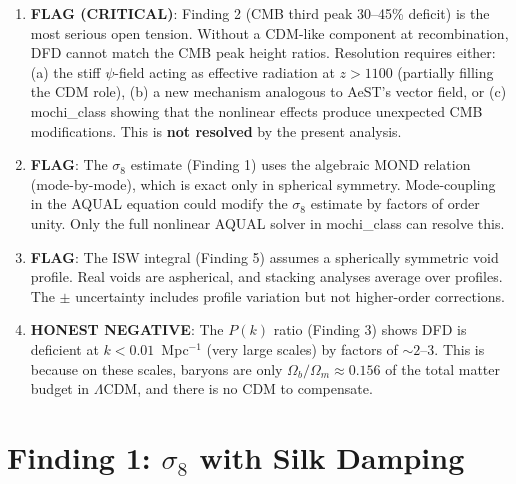 \documentclass[11pt]{article}
\newcommand{\LCDM}{$\Lambda$CDM}
\newcommand{\Ob}{\Omega_b}
\newcommand{\Om}{\Omega_m}
\begin{document}
\begin{tcolorbox}[colback=red!5!white, colframe=red!60!black,
  title=\textbf{INCONSISTENCIES, FLAGS, AND HONEST NEGATIVES}]
\begin{enumerate}[nosep]
\item \textbf{FLAG (CRITICAL)}: Finding 2 (CMB third peak 30--45\% deficit)
  is the most serious open tension. Without a CDM-like component at
  recombination, DFD cannot match the CMB peak height ratios.
  Resolution requires either: (a) the stiff $\psi$-field acting as
  effective radiation at $z > 1100$ (partially filling the CDM role),
  (b) a new mechanism analogous to AeST's vector field, or
  (c) mochi\_class showing that the nonlinear effects produce unexpected
  CMB modifications. This is \textbf{not resolved} by the present analysis.

\item \textbf{FLAG}: The $\sigma_8$ estimate (Finding 1) uses the
  algebraic MOND relation (mode-by-mode), which is exact only in
  spherical symmetry. Mode-coupling in the AQUAL equation could modify
  the $\sigma_8$ estimate by factors of order unity. Only the full
  nonlinear AQUAL solver in mochi\_class can resolve this.

\item \textbf{FLAG}: The ISW integral (Finding 5) assumes a
  spherically symmetric void profile. Real voids are aspherical,
  and stacking analyses average over profiles. The $\pm$ uncertainty
  includes profile variation but not higher-order corrections.

\item \textbf{HONEST NEGATIVE}: The $P(k)$ ratio (Finding 3) shows
  DFD is deficient at $k < 0.01$~Mpc$^{-1}$ (very large scales)
  by factors of $\sim 2$--$3$. This is because on these scales,
  baryons are only $\Ob/\Om \approx 0.156$ of the total matter budget
  in \LCDM, and there is no CDM to compensate.
\end{enumerate}
\end{tcolorbox}


\part{Finding 1: $\sigma_8$ with Silk Damping}
\label{part:sigma8}
\end{document}
